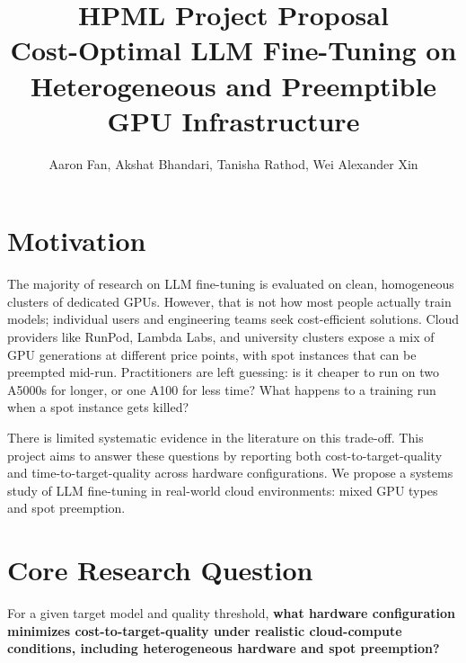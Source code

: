 \documentclass{article}
\title{HPML Project Proposal \\ Cost-Optimal LLM Fine-Tuning on Heterogeneous and Preemptible GPU Infrastructure}
\author{Aaron Fan, Akshat Bhandari, Tanisha Rathod, Wei Alexander Xin}
\begin{document}
\maketitle

\section{Motivation}
\par The majority of research on LLM fine-tuning is evaluated on clean, homogeneous clusters of dedicated GPUs. However, that is not how most people actually train models; individual users and engineering teams seek cost-efficient solutions. Cloud providers like RunPod, Lambda Labs, and university clusters expose a mix of GPU generations at different price points, with spot instances that can be preempted mid-run. Practitioners are left guessing: is it cheaper to run on two A5000s for longer, or one A100 for less time? What happens to a training run when a spot instance gets killed?
\par There is limited systematic evidence in the literature on this trade-off. This project aims to answer these questions by reporting both cost-to-target-quality and time-to-target-quality across hardware configurations. We propose a systems study of LLM fine-tuning in real-world cloud environments: mixed GPU types and spot preemption.

\section{Core Research Question}
\par For a given target model and quality threshold, \textbf{what hardware configuration minimizes cost-to-target-quality under realistic cloud-compute conditions, including heterogeneous hardware and spot preemption?}
\end{document}
